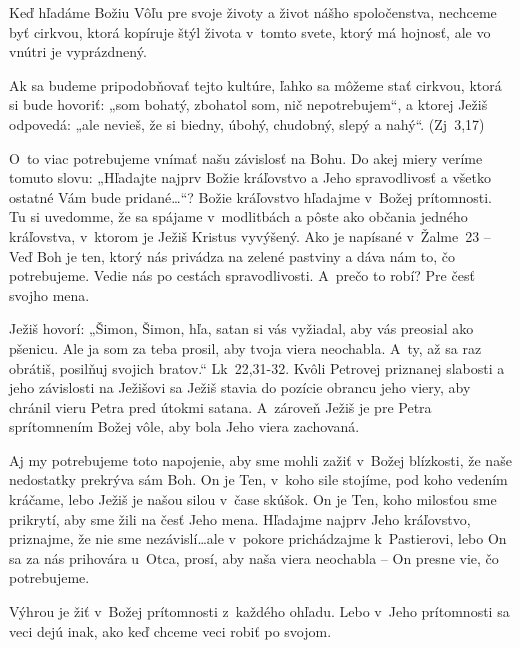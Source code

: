 \def\velkostpisma{10}
\def\velkostriadku{12.5}




Keď hľadáme Božiu Vôľu pre svoje životy a život nášho spoločenstva, nechceme byť cirkvou, ktorá kopíruje štýl života v~tomto svete, ktorý má hojnosť, ale vo vnútri je vyprázdnený.

Ak sa budeme pripodobňovať tejto kultúre, ľahko sa môžeme stať cirkvou, ktorá si bude hovoriť: „som bohatý, zbohatol som, nič nepotrebujem“, a ktorej Ježiš odpovedá: „ale nevieš, že si biedny, úbohý, chudobný, slepý a nahý“. (Zj~3,17)

O~to viac potrebujeme vnímať našu závislosť na Bohu.
Do akej miery veríme tomuto slovu: „Hľadajte najprv Božie kráľovstvo a Jeho spravodlivosť a všetko ostatné Vám bude pridané…“? Božie kráľovstvo hľadajme v~Božej prítomnosti. Tu si uvedomme, že sa spájame v~modlitbách a pôste ako občania jedného kráľovstva, v~ktorom je Ježiš Kristus vyvýšený. Ako je napísané v~Žalme~23 -- Veď Boh je ten, ktorý nás privádza na zelené pastviny a dáva nám to, čo potrebujeme. Vedie nás po cestách spravodlivosti. A~prečo to robí? Pre česť svojho mena.

Ježiš hovorí: „Šimon, Šimon, hľa, satan si vás vyžiadal, aby vás preosial ako pšenicu. Ale ja som za teba prosil, aby tvoja viera neochabla. A~ty, až sa raz obrátiš, posilňuj svojich bratov.“ Lk~22,31-32. Kvôli Petrovej priznanej slabosti a jeho závislosti na Ježišovi sa Ježiš stavia do pozície obrancu jeho viery, aby chránil vieru Petra pred útokmi satana. A~zároveň Ježiš je pre Petra sprítomnením Božej vôle, aby bola Jeho viera zachovaná.

Aj my potrebujeme toto napojenie, aby sme mohli zažiť v~Božej blízkosti, že naše nedostatky prekrýva sám Boh. On je Ten, v~koho sile stojíme, pod koho vedením kráčame, lebo Ježiš je našou silou v~čase skúšok. On je Ten, koho milosťou sme prikrytí, aby sme žili na česť Jeho mena. Hľadajme najprv Jeho kráľovstvo, priznajme, že nie sme nezávislí…ale v~pokore prichádzajme k~Pastierovi, lebo On sa za nás prihovára u~Otca, prosí, aby naša viera neochabla -- On presne vie, čo potrebujeme.

Výhrou je žiť v~Božej prítomnosti z~každého ohľadu. Lebo v~Jeho prítomnosti sa veci dejú inak, ako keď chceme veci robiť po svojom.

